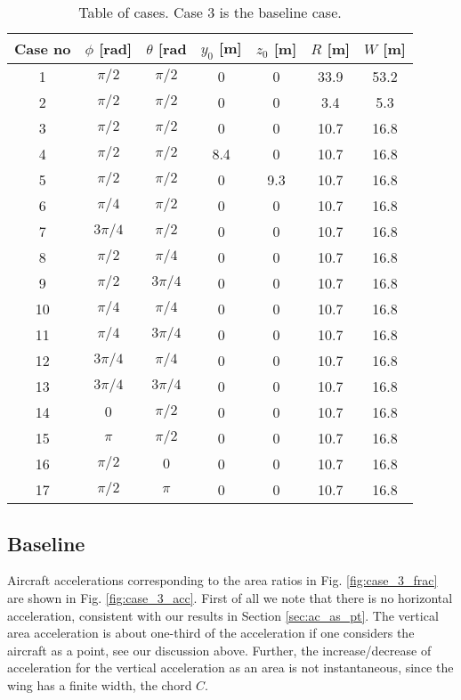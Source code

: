 \documentclass[smallextended]{svjour3}       %
\begin{document}
\begin{table}
\caption{Table of cases. Case 3 is the baseline case.}
\label{tab:cases}
 \begin{tabular}{ccccccc}
  \hline
  Case no & $\phi$ [rad] & $\theta$ [rad & $y_0$ [m] & $z_0$ [m] & $R$ [m] & $W$ [m] \\
  \hline
  1  & $\pi/2$ & $\pi/2$ & 0 & 0 & 33.9 & 53.2 \\
  2  & $\pi/2$ & $\pi/2$ & 0 & 0 & 3.4 & 5.3 \\
  3  & $\pi/2$ & $\pi/2$ & 0 & 0 & 10.7 & 16.8 \\
  4  & $\pi/2$ & $\pi/2$ & 8.4 & 0 & 10.7 & 16.8 \\
  5  & $\pi/2$ & $\pi/2$ & 0 & 9.3 & 10.7 & 16.8 \\
  6  & $\pi/4$ & $\pi/2$ & 0 & 0 & 10.7 & 16.8 \\
  7  & $3\pi/4$ & $\pi/2$ & 0 & 0 & 10.7 & 16.8 \\
  8  & $\pi/2$ & $\pi/4$ & 0 & 0 & 10.7 & 16.8 \\
  9  & $\pi/2$ & $3\pi/4$ & 0 & 0 & 10.7 & 16.8 \\
  10 & $\pi/4$ & $\pi/4$ & 0 & 0 & 10.7 & 16.8 \\
  11 & $\pi/4$ & $3\pi/4$ & 0 & 0 & 10.7 & 16.8 \\
  12 & $3\pi/4$ & $\pi/4$ & 0 & 0 & 10.7 & 16.8 \\
  13 & $3\pi/4$ & $3\pi/4$ & 0 & 0 & 10.7 & 16.8 \\
  14 & $0$ & $\pi/2$ & 0 & 0 & 10.7 & 16.8 \\
  15 & $\pi$ & $\pi/2$ & 0 & 0 & 10.7 & 16.8 \\
  16 & $\pi/2$ & $0$ & 0 & 0 & 10.7 & 16.8 \\
  17 & $\pi/2$ & $\pi$ & 0 & 0 & 10.7 & 16.8 \\
  \hline
\end{tabular}
\end{table}

\subsection{Baseline}

Aircraft accelerations corresponding to the area ratios in Fig. \ref{fig:case_3_frac} are shown in Fig. \ref{fig:case_3_acc}. First of all we note that there is no horizontal acceleration, consistent with our results in Section \ref{sec:ac_as_pt}. The vertical area acceleration is about one-third of the acceleration if one considers the aircraft as a point, see our discussion above. Further, the increase/decrease of acceleration for the vertical acceleration as an area is not instantaneous, since the wing has a finite width, the chord $C$.
\end{document}
